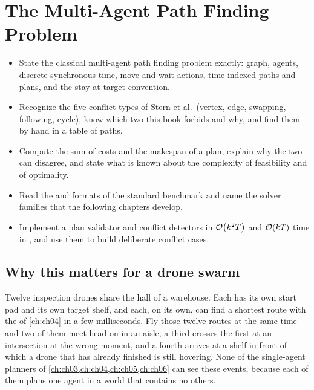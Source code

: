 \chapter{The Multi-Agent Path Finding Problem}
\label{ch:ch07}

\begin{objectives}
\begin{itemize}
  \item State the classical multi-agent path finding problem exactly: graph, agents, discrete synchronous time, move and wait actions, time-indexed paths and plans, and the stay-at-target convention.
  \item Recognize the five conflict types of Stern et al.\ (vertex, edge, swapping, following, cycle), know which two this book forbids and why, and find them by hand in a table of paths.
  \item Compute the sum of costs and the makespan of a plan, explain why the two can disagree, and state what is known about the complexity of feasibility and of optimality.
  \item Read the  and  formats of the standard benchmark and name the solver families that the following chapters develop.
  \item Implement a plan validator and conflict detectors in $\mathcal{O}\!\left(k^2T\right)$ and $\mathcal{O}\!\left(kT\right)$ time in \python, and use them to build deliberate conflict cases.
\end{itemize}
\end{objectives}

\section{Why this matters for a drone swarm}
\label{sec:ch07-motivation}

Twelve inspection drones share the hall of a warehouse. Each has its own start
pad and its own target shelf, and each, on its own, can find a shortest route
with the \astar of \cref{ch:ch04} in a few milliseconds. Fly those twelve
routes at the same time and two of them meet head-on in an aisle, a third
crosses the first at an intersection at the wrong moment, and a fourth arrives
at a shelf in front of which a drone that has already finished is still
hovering. None of the single-agent planners of
\cref{ch:ch03,ch:ch04,ch:ch05,ch:ch06} can see these events, because each of
them plans one agent in a world that contains no others.

